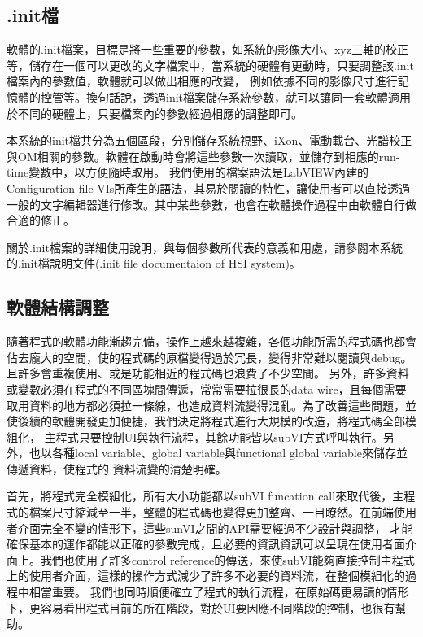 \documentclass[12pt]{article}
\begin{document}
\subsection{.init檔}
軟體的.init檔案，目標是將一些重要的參數，如系統的影像大小、xyz三軸的校正等，儲存在一個可以更改的文字檔案中，當系統的硬體有更動時，只要調整該.init檔案內的參數值，軟體就可以做出相應的改變，
例如依據不同的影像尺寸進行記憶體的控管等。換句話說，透過init檔案儲存系統參數，就可以讓同一套軟體適用於不同的硬體上，只要檔案內的參數經過相應的調整即可。

本系統的init檔共分為五個區段，分別儲存系統視野、iXon、電動載台、光譜校正與OM相關的參數。軟體在啟動時會將這些參數一次讀取，並儲存到相應的run-time變數中，以方便隨時取用。
我們使用的檔案語法是LabVIEW內建的Configuration file VIs所產生的語法，其易於閱讀的特性，讓使用者可以直接透過一般的文字編輯器進行修改。其中某些參數，也會在軟體操作過程中由軟體自行做合適的修正。

關於.init檔案的詳細使用說明，與每個參數所代表的意義和用處，請參閱本系統的.init檔說明文件(.init file documentaion of HSI system)。
\subsection{軟體結構調整}
隨著程式的軟體功能漸趨完備，操作上越來越複雜，各個功能所需的程式碼也都會佔去龐大的空間，使的程式碼的原檔變得過於冗長，變得非常難以閱讀與debug。且許多會重複使用、或是功能相近的程式碼也浪費了不少空間。
另外，許多資料或變數必須在程式的不同區塊間傳遞，常常需要拉很長的data wire，且每個需要取用資料的地方都必須拉一條線，也造成資料流變得混亂。為了改善這些問題，並使後續的軟體開發更加便捷，我們決定將程式進行大規模的改造，將程式碼全部模組化，
主程式只要控制UI與執行流程，其餘功能皆以subVI方式呼叫執行。另外，也以各種local variable、global variable與functional global variable來儲存並傳遞資料，使程式的
資料流變的清楚明確。

首先，將程式完全模組化，所有大小功能都以subVI funcation call來取代後，主程式的檔案尺寸縮減至一半，整體的程式碼也變得更加整齊、一目瞭然。在前端使用者介面完全不變的情形下，這些sunVI之間的API需要經過不少設計與調整，
才能確保基本的運作都能以正確的參數完成，且必要的資訊資訊可以呈現在使用者面介面上。我們也使用了許多control reference的傳送，來使subVI能夠直接控制主程式上的使用者介面，這樣的操作方式減少了許多不必要的資料流，在整個模組化的過程中相當重要。
我們也同時順便確立了程式的執行流程，在原始碼更易讀的情形下，更容易看出程式目前的所在階段，對於UI要因應不同階段的控制，也很有幫助。
\end{document}
